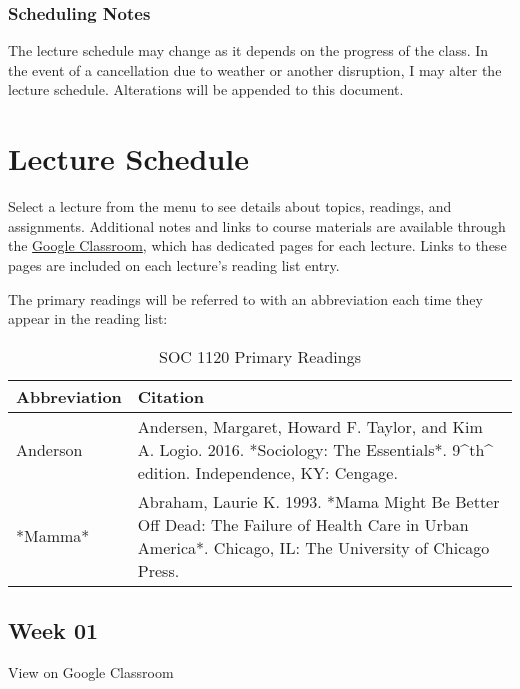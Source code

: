 \documentclass[]{book}
\theoremstyle{definition}
\theoremstyle{definition}
\theoremstyle{definition}
\theoremstyle{remark}
\begin{document}
\hypertarget{scheduling-notes}{%
\subsection{Scheduling Notes}\label{scheduling-notes}}

The lecture schedule may change as it depends on the progress of the
class. In the event of a cancellation due to weather or another
disruption, I may alter the lecture schedule. Alterations will be
appended to this document.

\hypertarget{lecture-schedule}{%
\chapter{Lecture Schedule}\label{lecture-schedule}}

Select a lecture from the menu to see details about topics, readings,
and assignments. Additional notes and links to course materials are
available through the \href{https://classroom.google.com}{Google
Classroom}, which has dedicated pages for each lecture. Links to these
pages are included on each lecture's reading list entry.

The primary readings will be referred to with an abbreviation each time
they appear in the reading list:

\begin{table}

\caption{\label{tab:unnamed-chunk-1}SOC 1120 Primary Readings}
\centering
\begin{tabular}[t]{ll}
\toprule
Abbreviation & Citation\\
\midrule
Anderson & Andersen, Margaret, Howard F. Taylor, and Kim A. Logio. 2016. *Sociology: The Essentials*. 9\textasciicircum{}th\textasciicircum{} edition. Independence, KY: Cengage.\\
*Mamma* & Abraham, Laurie K. 1993. *Mama Might Be Better Off Dead: The Failure of Health Care in Urban America*. Chicago, IL: The University of Chicago Press.\\
\bottomrule
\end{tabular}
\end{table}

\hypertarget{week-01}{%
\section*{Week 01}\label{week-01}}

View on Google Classroom
\end{document}
